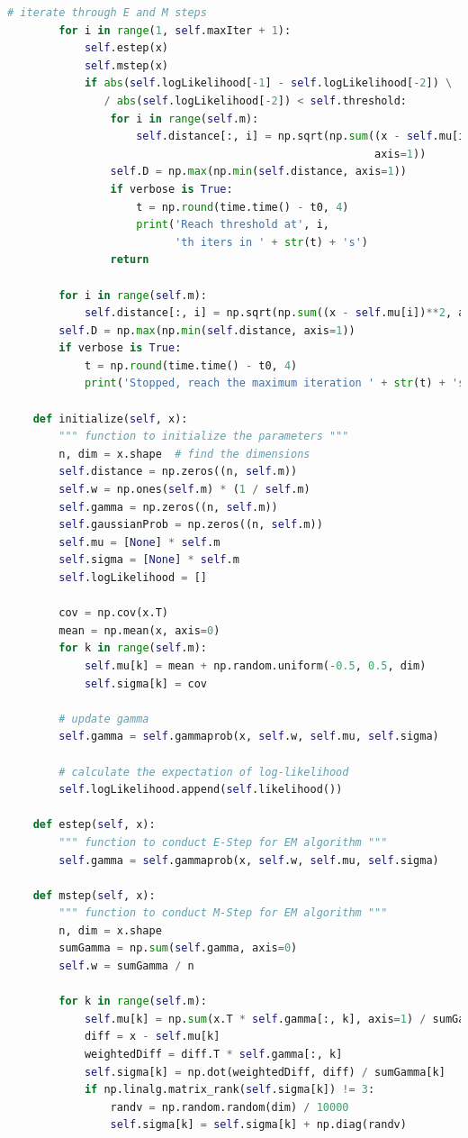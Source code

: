 \begin{description}
\begin{description}
\begin{lstlisting}[language=Python, caption=EM Algorithm Python Code]
        # iterate through E and M steps
        for i in range(1, self.maxIter + 1):
            self.estep(x)
            self.mstep(x)
            if abs(self.logLikelihood[-1] - self.logLikelihood[-2]) \
               / abs(self.logLikelihood[-2]) < self.threshold:
                for i in range(self.m):
                    self.distance[:, i] = np.sqrt(np.sum((x - self.mu[i])**2,
                                                         axis=1))
                self.D = np.max(np.min(self.distance, axis=1))
                if verbose is True:
                    t = np.round(time.time() - t0, 4)
                    print('Reach threshold at', i,
                          'th iters in ' + str(t) + 's')
                return

        for i in range(self.m):
            self.distance[:, i] = np.sqrt(np.sum((x - self.mu[i])**2, axis=1))
        self.D = np.max(np.min(self.distance, axis=1))
        if verbose is True:
            t = np.round(time.time() - t0, 4)
            print('Stopped, reach the maximum iteration ' + str(t) + 's')

    def initialize(self, x):
        """ function to initialize the parameters """
        n, dim = x.shape  # find the dimensions
        self.distance = np.zeros((n, self.m))
        self.w = np.ones(self.m) * (1 / self.m)
        self.gamma = np.zeros((n, self.m))
        self.gaussianProb = np.zeros((n, self.m))
        self.mu = [None] * self.m
        self.sigma = [None] * self.m
        self.logLikelihood = []

        cov = np.cov(x.T)
        mean = np.mean(x, axis=0)
        for k in range(self.m):
            self.mu[k] = mean + np.random.uniform(-0.5, 0.5, dim)
            self.sigma[k] = cov

        # update gamma
        self.gamma = self.gammaprob(x, self.w, self.mu, self.sigma)

        # calculate the expectation of log-likelihood
        self.logLikelihood.append(self.likelihood())

    def estep(self, x):
        """ function to conduct E-Step for EM algorithm """
        self.gamma = self.gammaprob(x, self.w, self.mu, self.sigma)

    def mstep(self, x):
        """ function to conduct M-Step for EM algorithm """
        n, dim = x.shape
        sumGamma = np.sum(self.gamma, axis=0)
        self.w = sumGamma / n

        for k in range(self.m):
            self.mu[k] = np.sum(x.T * self.gamma[:, k], axis=1) / sumGamma[k]
            diff = x - self.mu[k]
            weightedDiff = diff.T * self.gamma[:, k]
            self.sigma[k] = np.dot(weightedDiff, diff) / sumGamma[k]
            if np.linalg.matrix_rank(self.sigma[k]) != 3:
                randv = np.random.random(dim) / 10000
                self.sigma[k] = self.sigma[k] + np.diag(randv)


\end{lstlisting}
\end{description}
\end{description}
